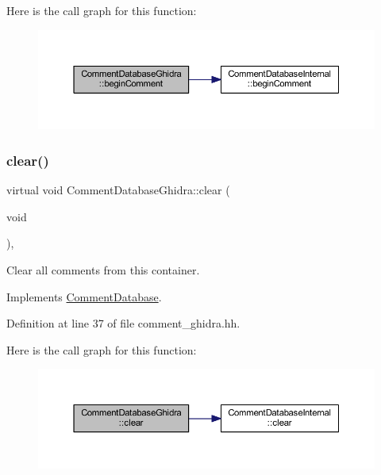 Here is the call graph for this function\+:
\nopagebreak
\begin{figure}[H]
\begin{center}
\leavevmode
\includegraphics[width=350pt]{class_comment_database_ghidra_a3fc25277281f61f2aa851b4bbb1e33f1_cgraph}
\end{center}
\end{figure}
\mbox{\label{class_comment_database_ghidra_a723dd4415e6eab6c4b5edacbc97a9332}} 
\subsubsection{\texorpdfstring{clear()}{clear()}}
{\footnotesize\ttfamily virtual void Comment\+Database\+Ghidra\+::clear (\begin{DoxyParamCaption}\item[{void}]{ }\end{DoxyParamCaption})\hspace{0.3cm}{\ttfamily [inline]}, {\ttfamily [virtual]}}



Clear all comments from this container. 



Implements \mbox{\hyperlink{class_comment_database_a11e384fc79f6cf6e8c7af6c608df4baa}{Comment\+Database}}.



Definition at line 37 of file comment\+\_\+ghidra.\+hh.

Here is the call graph for this function\+:
\nopagebreak
\begin{figure}[H]
\begin{center}
\leavevmode
\includegraphics[width=350pt]{class_comment_database_ghidra_a723dd4415e6eab6c4b5edacbc97a9332_cgraph}
\end{center}
\end{figure}
\mbox{\label{class_comment_database_ghidra_ac5b963863187535cd0c2150bc7df4510}} 
